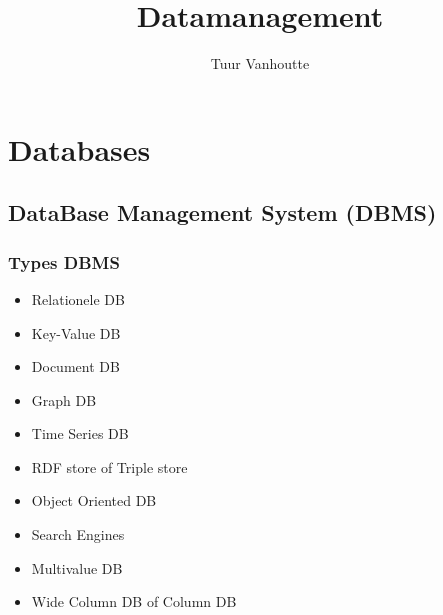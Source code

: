 \documentclass{article}
\begin{document}
\begin{titlepage}
    \author{Tuur Vanhoutte}
    \title{Datamanagement}
\end{titlepage}

\maketitle
\newpage
\tableofcontents
\newpage

\section{Databases}

\subsection{DataBase Management System (DBMS)}
\subsubsection{Types DBMS}
\begin{itemize}
    \item Relationele DB
    \item Key-Value DB
    \item Document DB
    \item Graph DB
    \item Time Series DB
    \item RDF store of Triple store
    \item Object Oriented DB
    \item Search Engines
    \item Multivalue DB
    \item Wide Column DB of Column DB
\end{itemize}
\end{document}
